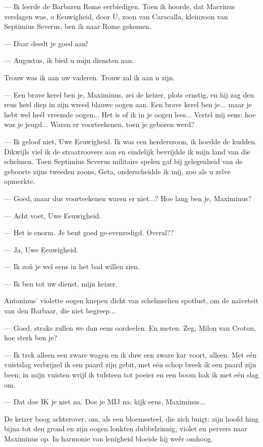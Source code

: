 \documentclass[a4paper, 12pt, oneside, dutch]{article}
\begin{document}
--- Ik leerde de Barbaren Rome eerbiedigen. Toen ik hoorde, dat Macrinus verslagen was, o Eeuwigheid, door U, zoon van Caracalla, kleinzoon van Septimius Severus, ben ik naar Rome gekomen.

--- Daar deedt je goed aan!

--- Augustus, ik bied u mijn diensten aan.

Trouw was ik aan uw vaderen. Trouw zal ik aan u zijn.

--- Een brave kerel ben je, Maximinus, zei de keizer, plots ernstig, en hij zag den reus heel diep in zijn wreed blauwe oogen aan. Een brave kerel ben je... maar je hebt wel heél vreemde oogen... Het is of ik in je oogen lees... Vertel mij eens: hoe was je jeugd... Waren er voorteekenen, toen je geboren werd?

--- Ik geloof niet, Uwe Eeuwigheid. Ik was een herderszoon, ik hoedde de kudden. Dikwijls viel ik de straatroovers aan en eindelijk bevrijdde ik mijn land van die schelmen. Toen Septimius Severus militaire spelen gaf bij gelegenheid van de geboorte zijns tweeden zoons, Geta, onderscheidde ik mij, zoo als u zelve opmerkte.

--- Goed, maar dus voorteekenen waren er niet...? Hoe lang ben je, Maximinus?

--- Acht voet, Uwe Eeuwigheid.

--- Het is enorm. Je bent goed ge-evenredigd. Overal??

--- Ja, Uwe Eeuwigheid.

--- Ik zoû je wel eens in het bad willen zien.

--- Ik ben tot uw dienst, mijn keizer.

Antoninus' violette oogen knepen dicht van schelmschen spotlust, om de naïveteit van den Barbaar, die niet begreep...

--- Goed, straks zullen we dan eens oordeelen. En meten. Zeg, Milon van Croton, hoe sterk ben je?

--- Ik trek alleen een zware wagen en ik duw een zware kar voort, alleen. Met eén vuistslag verbrijzel ik een paard zijn gebit, met eén schop breek ik een paard zijn been; in mijn vuisten wrijf ik tufsteen tot poeier en een boom hak ik met eén slag om.

--- Dat doe IK je niet na. Doe je MIJ na; kijk eens, Maximinus...

De keizer boog achterover, om, als een bloemesteel, die zich buigt: zijn hoofd hing bijna tot den grond en zijn oogen lonkten dubbelzinnig, violet en pervers naar Maximinus op. In harmonie van lenigheid bloeide hij weêr omhoog.
\end{document}
